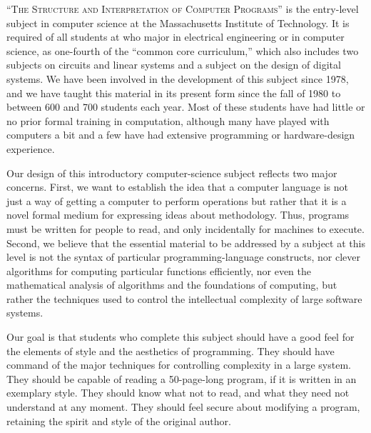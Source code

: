 \label{Preface 1e}

\vspace{2em}

\lettrine[lhang=0.17]{“T}{he Structure and Interpretation of Computer Programs”} is the entry-level subject in computer science at the Massachusetts Institute of Technology.
It is required of all students at  who major in electrical engineering or in computer science, as one-fourth of the “common core curriculum,” which also includes two subjects on circuits and linear systems and a subject on the design of digital systems.
We have been involved in the development of this subject since 1978, and we have taught this material in its present form since the fall of 1980 to between 600 and 700 students each year.
Most of these students have had little or no prior formal training in computation, although many have played with computers a bit and a few have had extensive programming or hardware-design experience.

Our design of this introductory computer-science subject reflects two major concerns.
First, we want to establish the idea that a computer language is not just a way of getting a computer to perform operations but rather that it is a novel formal medium for expressing ideas about methodology.
Thus, programs must be written for people to read, and only incidentally for machines to execute.
Second, we believe that the essential material to be addressed by a subject at this level is not the syntax of particular programming-language constructs, nor clever algorithms for computing particular functions efficiently, nor even the mathematical analysis of algorithms and the foundations of computing, but rather the techniques used to control the intellectual complexity of large software systems.

Our goal is that students who complete this subject should have a good feel for the elements of style and the aesthetics of programming.
They should have command of the major techniques for controlling complexity in a large system.
They should be capable of reading a 50-page-long program, if it is written in an exemplary style.
They should know what not to read, and what they need not understand at any moment.
They should feel secure about modifying a program, retaining the spirit and style of the original author.

